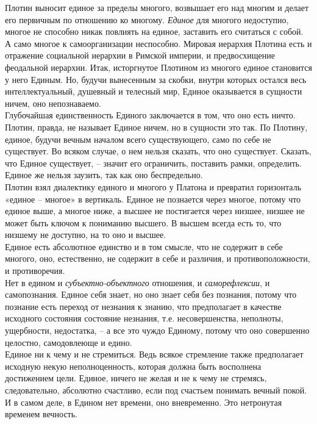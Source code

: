 \documentclass[a4paper,12pt]{article}
\begin{document}
\medskip
Плотин  выносит единое за пределы многого, возвышает его над многим и делает его первичным по отношению ко многому. \textit{Единое} для многого недоступно, многое не способно никак повлиять на единое, заставить его считаться с собой. А само многое к самоорганизации неспособно. Мировая иерархия Плотина есть и отражение социальной иерархии в Римской империи, и предвосхищение феодальной иерархии.
Итак, исторгнутое Плотином из многого единое становится у него Единым. Но, будучи вынесенным за скобки, внутри которых остался весь интеллектуальный, душевный и телесный мир, Единое оказывается в сущности ничем, оно непознаваемо.\\

\medskip
Глубочайшая единственность Единого заключается в том, что оно есть ничто. Плотин, правда, не называет Единое ничем, но в сущности это так. По Плотину, единое, будучи вечным началом всего существующего, само по себе не существует. Во всяком случае, о нем нельзя сказать, что оно существует. Сказать, что Единое существует, – значит его ограничить, поставить рамки, определить. Единое же нельзя заузить, так как оно беспредельно.\\

\medskip 
Плотин взял диалектику единого и многого у Платона и превратил горизонталь «единое – многое» в вертикаль. Единое не познается через многое, потому что единое выше, а многое ниже, а высшее не постигается через низшее, низшее не может быть ключом к пониманию высшего. В высшем всегда есть то, что низшему не доступно, на то оно и высшее.\\

Единое есть абсолютное единство и в том смысле, что не содержит в себе многого, оно, естественно, не содержит в себе и различия, и противоположности, и противоречия.\\

Нет в едином и \textit{субъектно-объектного} отношения, и \textit{саморефлексии}, и самопознания. Единое себя знает, но оно знает себя без познания, потому что познание есть переход от незнания к знанию, что предполагает в качестве исходного состояния состояние незнания, т.е. несовершенства, неполноты, ущербности, недостатка, – а все это чуждо Единому, потому что оно совершенно целостно, самодовлеюще и едино.\\

Единое ни к чему и не стремиться. Ведь всякое стремление также предполагает исходную некую неполноценность, которая должна быть восполнена достижением цели. Единое, ничего не желая и не к чему не стремясь, следовательно, абсолютно счастливо, если под счастьем понимать вечный покой. И в самом деле, в Едином нет времени, оно вневременно. Это нетронутая временем вечность.\\
\end{document}

